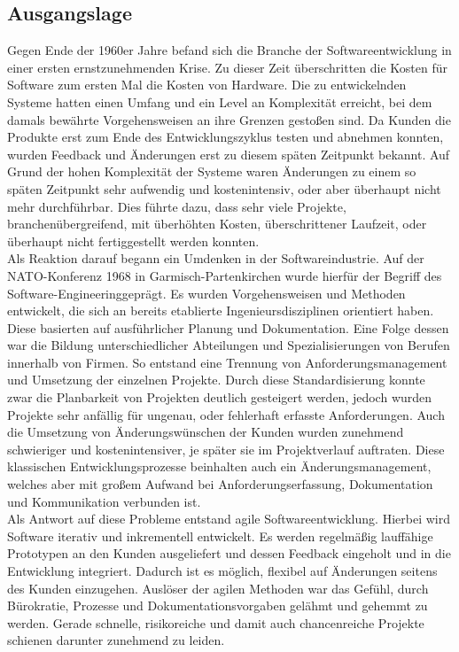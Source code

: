 \subsection{Ausgangslage}
Gegen Ende der 1960er Jahre befand sich die Branche der Softwareentwicklung in einer ersten ernstzunehmenden Krise. Zu dieser Zeit überschritten die Kosten für Software zum ersten Mal die Kosten von Hardware. Die zu entwickelnden Systeme hatten einen Umfang und ein Level an Komplexität erreicht, bei dem damals bewährte Vorgehensweisen an ihre Grenzen gestoßen sind. Da Kunden die Produkte erst zum Ende des Entwicklungszyklus testen und abnehmen konnten, wurden Feedback und Änderungen erst zu diesem späten Zeitpunkt bekannt. Auf Grund der hohen Komplexität der Systeme waren Änderungen zu einem so späten Zeitpunkt sehr aufwendig und kostenintensiv, oder aber überhaupt nicht mehr durchführbar. Dies führte dazu, dass sehr viele Projekte, branchenübergreifend, mit überhöhten Kosten, überschrittener Laufzeit, oder überhaupt nicht fertiggestellt werden konnten.\\
Als Reaktion darauf begann ein Umdenken in der Softwareindustrie. Auf der NATO-Konferenz 1968 in Garmisch-Partenkirchen wurde hierfür der Begriff des \glqq Software-Engineering\grqq geprägt. \parencite[][S. 8]{Naur:1968} Es wurden Vorgehensweisen und Methoden entwickelt, die sich an bereits etablierte Ingenieursdisziplinen orientiert haben. Diese basierten auf ausführlicher Planung und Dokumentation. Eine Folge dessen war die Bildung unterschiedlicher Abteilungen und Spezialisierungen von Berufen innerhalb von Firmen. So entstand eine Trennung von Anforderungsmanagement und Umsetzung der einzelnen Projekte. Durch diese Standardisierung konnte zwar die Planbarkeit von Projekten deutlich gesteigert werden, jedoch wurden Projekte sehr anfällig für ungenau, oder fehlerhaft erfasste Anforderungen. Auch die Umsetzung von Änderungswünschen der Kunden wurden zunehmend schwieriger und kostenintensiver, je später sie im Projektverlauf auftraten. Diese klassischen Entwicklungsprozesse beinhalten auch ein Änderungsmanagement, welches aber mit großem Aufwand bei Anforderungserfassung, Dokumentation und Kommunikation verbunden ist.\\
Als Antwort auf diese Probleme entstand agile Softwareentwicklung. Hierbei wird Software iterativ und inkrementell entwickelt. Es werden regelmäßig lauffähige Prototypen an den Kunden ausgeliefert und dessen Feedback eingeholt und in die Entwicklung integriert. Dadurch ist es möglich, flexibel auf Änderungen seitens des Kunden einzugehen. \glqq Auslöser der agilen Methoden war das Gefühl, durch Bürokratie, Prozesse und Dokumentationsvorgaben gelähmt und gehemmt zu werden. Gerade schnelle, risikoreiche und damit auch chancenreiche Projekte schienen darunter zunehmend zu leiden.\grqq \parencite[][S. 183]{Schneider:2007}

